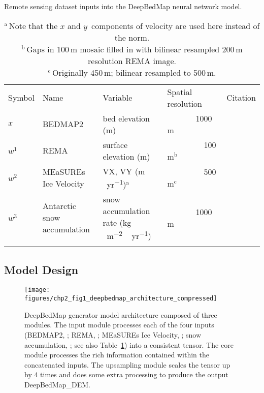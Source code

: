 \begin{landscape}
\vspace*{120pt}
\begin{table*}[ht]
  \small
  \caption{Remote sensing dataset inputs into the DeepBedMap neural network model.}
  \label{table:datainputs}
  \begin{tabular}{lllll}
  \tophline
  Symbol & Name                        & Variable                                           & Spatial resolution           & Citation                                         \\
  \middlehline
  $x$    & BEDMAP2                     & bed elevation (\unit{m})                           & {~~~~~~~}1000\,\unit{m}               & \citet{FretwellBedmap2improvedice2013}           \\
  $w^1$  & REMA                        & surface elevation (\unit{m})                       & {~~~~~~~~~}100\,\unit{m}$^{\mathrm{b}}$ & \citet{HowatReferenceElevationModel2018}         \\
  $w^2$  & MEaSUREs Ice Velocity       & VX, VY (\unit{m\,yr^{-1}})$^{\mathrm{a}}$          & {~~~~~~~~~}500\,\unit{m}$^{\mathrm{c}}$ & \citet{MouginotContinentWideInterferometric2019} \\
  $w^3$  & Antarctic snow accumulation & snow accumulation rate (\unit{kg\,m^{-2}\,yr^{-1}}) & {~~~~~~~}1000\,\unit{m}               & \citet{ArthernAntarcticsnowaccumulation2006}     \\
  \bottomhline
  \end{tabular}
  \caption*{$^{\mathrm{a}}$\,Note that the $x$ and $y$~components of velocity are used here instead of the norm. \\
  $^{\mathrm{b}}$\,Gaps in 100\,\unit{m} mosaic filled in with bilinear resampled 200\,\unit{m} resolution REMA image. \\
  $^{\mathrm{c}}$\,Originally 450\,\unit{m}; bilinear resampled to 500\,\unit{m}.} %
\end{table*}
\end{landscape}

\subsection{Model Design} \label{section:modeldesign}

\begin{figure*}[ht]
  \texttt{[image: figures/chp2\_fig1\_deepbedmap\_architecture\_compressed]}
  \caption[DeepBedMap generator model architecture]{
    DeepBedMap generator model architecture composed of three modules.
    The input module processes each of the four inputs (BEDMAP2, \citealp{FretwellBedmap2improvedice2013}; REMA, \citealp{HowatReferenceElevationModel2019}; MEaSUREs Ice Velocity, \citealp{MouginotMEaSUREsPhaseMap2019}; snow accumulation, \citealp{ArthernAntarcticsnowaccumulation2006}; see also Table~\ref{table:datainputs}) into a consistent tensor.
    The core module processes the rich information contained within the concatenated inputs.
    The upsampling module scales the tensor up by 4 times and does some extra processing to produce the output DeepBedMap\_DEM.
  }
  \label{fig:1}
\end{figure*}

